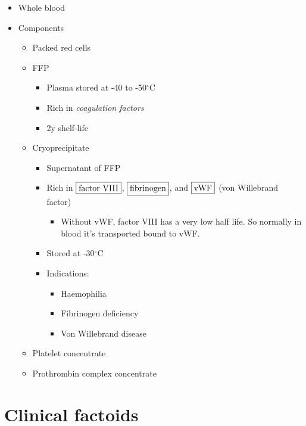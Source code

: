 \documentclass[
  14pt,
]{memoir}
\providecommand{\tightlist}{%
  \setlength{\itemsep}{0pt}\setlength{\parskip}{0pt}}
\begin{document}
\begin{itemize}
\tightlist
\item
  Whole blood
\item
  Components

  \begin{itemize}
  \tightlist
  \item
    Packed red cells
  \item
    FFP

    \begin{itemize}
    \tightlist
    \item
      Plasma stored at -40 to -50\(^\circ\)C
    \item
      Rich in \emph{coagulation factors}
    \item
      2y shelf-life
    \end{itemize}
  \item
    Cryoprecipitate

    \begin{itemize}
    \tightlist
    \item
      Supernatant of FFP
    \item
      Rich in \(\fbox{factor VIII}\), \(\fbox{fibrinogen}\), and
      \(\fbox{vWF}\) (von Willebrand factor)

      \begin{itemize}
      \tightlist
      \item
        Without vWF, factor VIII has a very low half life. So normally
        in blood it's transported bound to vWF.
      \end{itemize}
    \item
      Stored at -30\(^\circ\)C
    \item
      Indications:

      \begin{itemize}
      \tightlist
      \item
        Haemophilia
      \item
        Fibrinogen deficiency
      \item
        Von Willebrand disease
      \end{itemize}
    \end{itemize}
  \item
    Platelet concentrate
  \item
    Prothrombin complex concentrate
  \end{itemize}
\end{itemize}

\hypertarget{clinical-factoids}{%
\section{Clinical factoids}\label{clinical-factoids}}
\end{document}
